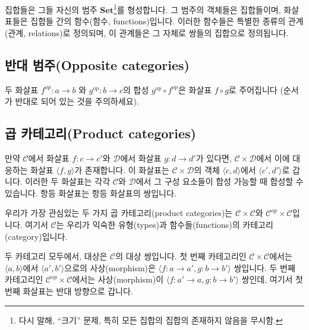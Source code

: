 \documentclass[DaoFP]{subfiles}
\begin{document}
집합들은 그들 자신의 범주 $\mathbf{Set}$\footnote{다시 말해, ``크기'' 문제, 특히 모든 집합의 집합의 존재하지 않음을 무시함.}를 형성합니다. 그 범주의 객체들은 집합들이며, 화살표들은 집합들 간의 함수(함수, functions)입니다. 이러한 함수들은 특별한 종류의 관계(관계, relations)로 정의되며, 이 관계들은 그 자체로 쌍들의 집합으로 정의됩니다.







\subsection{반대 범주(Opposite categories)}

 






두 화살표 $f^{op} \colon a \to b$ 와 $g^{op} \colon b \to c$의 합성 $g^{op} \circ f^{op}$은 화살표 $f \circ g$로 주어집니다 (순서가 반대로 되어 있는 것을 주의하세요).



\subsection{곱 카테고리(Product categories)}



만약 $\mathcal{C}$에서 화살표 $f \colon c \to c'$와 $\mathcal{D}$에서 화살표 $g \colon d \to d'$가 있다면, $\mathcal{C} \times \mathcal{D}$에서 이에 대응하는 화살표 $\langle f, g \rangle$가 존재합니다. 이 화살표는 $\mathcal{C} \times \mathcal{D}$의 객체 $\langle c, d \rangle$에서 $\langle c', d' \rangle$로 갑니다. 이러한 두 화살표는 각각 $\mathcal{C}$와 $\mathcal{D}$에서 그 구성 요소들이 합성 가능할 때 합성할 수 있습니다. 항등 화살표는 항등 화살표의 쌍입니다.

우리가 가장 관심있는 두 가지 곱 카테고리(product categories)는 $\mathcal{C} \times \mathcal{C}$와 $\mathcal{C}^{op} \times \mathcal{C}$입니다. 여기서 $\mathcal{C}$는 우리가 익숙한 유형(types)과 함수들(functions)의 카테고리(category)입니다.

두 카테고리 모두에서, 대상은 $\mathcal{C}$의 대상 쌍입니다. 첫 번째 카테고리인 $\mathcal{C} \times \mathcal{C}$에서는 $\langle a, b \rangle $에서 $\langle a', b' \rangle $으로의 사상(morphism)은 $\langle f \colon a \to a', g \colon b \to b' \rangle $ 쌍입니다. 두 번째 카테고리인 $\mathcal{C}^{op} \times \mathcal{C}$에서는 사상(morphism)이 $\langle f \colon a' \to a, g \colon b \to b' \rangle $ 쌍인데, 여기서 첫 번째 화살표는 반대 방향으로 갑니다.
\end{document}
